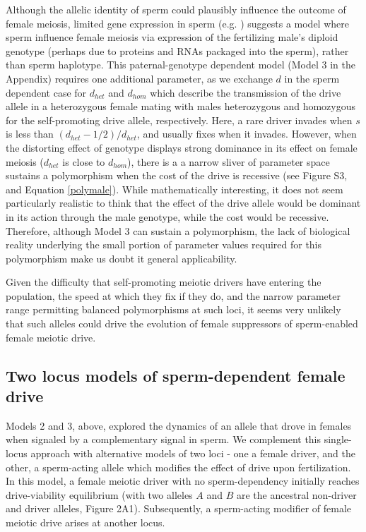 \documentclass{pnastwo}
\begin{document}
\begin{article}
Although the allelic identity of sperm could plausibly influence the outcome of female meiosis, 
	limited gene expression in sperm (e.g. \cite{Joseph2004}) 
	suggests a model where sperm influence female meiosis via expression of the fertilizing male's
	diploid genotype (perhaps due to proteins and RNAs packaged into the sperm), rather than sperm haplotype.
This paternal-genotype dependent model (Model 3  in the Appendix) requires one additional parameter, as we exchange $d$ in the sperm dependent case for $d_{het}$ and $d_{hom}$ which describe the transmission of the drive allele in a heterozygous female mating with males heterozygous and homozygous for the self-promoting drive allele, respectively.  
Here, a rare driver invades when $s$ is less than $(d_{het}-1/2)/d_{het}$, and usually fixes when it invades.
However, when the distorting effect of genotype displays strong dominance in its
	effect on female meiosis ($d_{het}$ is close to $d_{hom}$), 
	there is a a narrow sliver of parameter space sustains a polymorphism
	when the cost of the drive is recessive
	(see Figure S3, and Equation \ref{polymale}).  
While mathematically interesting, it does not seem particularly realistic to think that the
	effect of the drive allele would be dominant in its action through the
	male genotype, while the cost would be recessive. 
Therefore, although Model 3 can sustain a polymorphism, 
	the lack of biological reality underlying the small portion of parameter values 
	required for this polymorphism make us doubt it general applicability. 


Given the difficulty that self-promoting meiotic drivers have entering the population, the speed at
which they fix if they do, and the narrow parameter range permitting balanced polymorphisms at such loci,  
it seems very unlikely that such alleles could drive the evolution of female suppressors of sperm-enabled
female meiotic drive.

\subsection{Two locus models of sperm-dependent female drive}
Models 2 and 3, above, explored the dynamics of an allele that drove in females when signaled by a complementary signal in sperm.   
We complement this single-locus approach 
	with alternative models of two loci - one a female driver, 
	and the other, a sperm-acting allele which modifies the effect of drive upon fertilization. 
In this model, a female meiotic driver with no sperm-dependency 
	initially reaches drive-viability equilibrium (with two alleles
	$A$ and $B$ are the ancestral non-driver and driver alleles, Figure 2A1). 
Subsequently, a sperm-acting modifier of female meiotic drive arises at another locus. 


\end{article}
\end{document}

